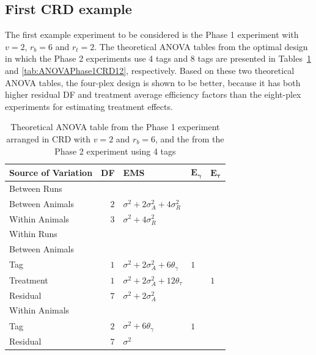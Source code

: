 \documentclass[12pt,a4paper]{article}
\begin{document}
\subsection{First CRD example}
The first example experiment to be considered is the Phase 1 experiment with $v = 2$, $r_b = 6$ and $r_t = 2$. The theoretical ANOVA tables from the optimal design in which the Phase 2 experiments use 4 tags and 8 tags are presented in Tables~\ref{tab:ANOVAPhase1CRD11} and \ref{tab:ANOVAPhase1CRD12}, respectively. 
Based on these two theoretical ANOVA tables, the four-plex design is shown to be better, because it has both higher residual DF and treatment average efficiency factors than the eight-plex experiments for estimating treatment effects. 

\begin{table}[ht]
\centering
 \caption{Theoretical ANOVA table from the Phase 1 experiment arranged in CRD with $v = 2$ and $r_b = 6$, and the from the Phase 2 experiment using 4 tags}
 \begin{tabular}[t]{lrlll} 
 \toprule 
 \multicolumn{1}{l}{\textbf{Source of Variation}} & \multicolumn{1}{l}{\textbf{DF}} & \multicolumn{1}{l}{\textbf{EMS}}& \multicolumn{1}{l}{$\bm{E_{\gamma}}$}&\multicolumn{1}{l}{$\bm{E_{\tau}}$}\\ 
 \midrule 
 Between Runs &  &  & & \\ 
 \quad Between Animals & $2$ & $\sigma^2+2\sigma_{A}^2+4\sigma_{R}^2$ & & \\  \quad Within Animals & $3$ & $\sigma^2+4\sigma_{R}^2$ & & \\ \hline 
 Within Runs &  &  & & \\ 
 \quad Between Animals &  &  & & \\ 
 \quad \quad Tag & $1$ & $\sigma^2+2\sigma_{A}^2+6\theta_{\gamma}$ &$1$ & \\ 
 \quad \quad Treatment & $1$ & $\sigma^2+2\sigma_{A}^2+12\theta_{\tau}$ & & $1$\\ 
 \quad \quad Residual & $7$ & $\sigma^2+2\sigma_{A}^2$ & & \\ \hline 
 \quad Within Animals &  &  & & \\ 
 \quad \quad Tag & $2$ & $\sigma^2+6\theta_{\gamma}$ &$1$ & \\ 
 \quad \quad Residual & $7$ & $\sigma^2$ & & \\ 
 \bottomrule 
 \end{tabular} 
 \label{tab:ANOVAPhase1CRD11} 
\end{table} 
\end{document}
